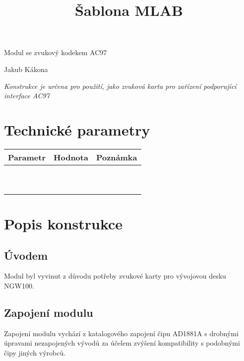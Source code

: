 \documentclass[a4paper]{article}
\title{\v{S}ablona MLAB}
\author{}
\date{}
\begin{document}
\clearpage\setcounter{page}{1}\pagestyle{Standard}
{\centering{}\sffamily
Modul se zvukov\'y kodekem AC97
\par}

{\centering{}\sffamily
Jakub K\'akona
\par}

{\sffamily\itshape
Konstrukce je ur\v{c}ena pro pou\v{z}it\'i, jako zvukov\'a karta pro
za\v{r}\'izen\'i podporuj\'ic\'i interface AC97}

{%
 \par}

\setcounter{tocdepth}{3}
\renewcommand\contentsname{}
\tableofcontents

\bigskip

\section{Technick\'e parametry}
\begin{flushleft}
\tablehead{}
\begin{supertabular}{|m{5.5490003cm}|m{5.5490003cm}|m{5.6740003cm}|}
\hline
{}\bfseries Parametr &
\bfseries Hodnota &
\bfseries Pozn\'amka\\\hline
~
 &
~
 &
~
\\\hline
~
 &
~
 &
~
\\\hline
\end{supertabular}
\end{flushleft}
\section[Popis konstrukce]{Popis konstrukce}
\subsection{\'Uvodem}
{
Modul byl vyvinut z d\r{u}vodu pot\v{r}eby zvukov\'e karty pro
v\'yvojovou desku NGW100.}

\subsection{Zapojen\'i modulu}
{
Zapojen\'i modulu vych\'az\'i z katalogov\'eho zapojen\'i \v{c}ipu
AD1881A s drobn\'ymi \'upravami nezapojen\'ych v\'yvod\r{u} za
\'u\v{c}elem zv\'y\v{s}en\'i kompatibility s podobn\'ymi \v{c}ipy
jin\'ych v\'yrobc\r{u}.}
\end{document}
